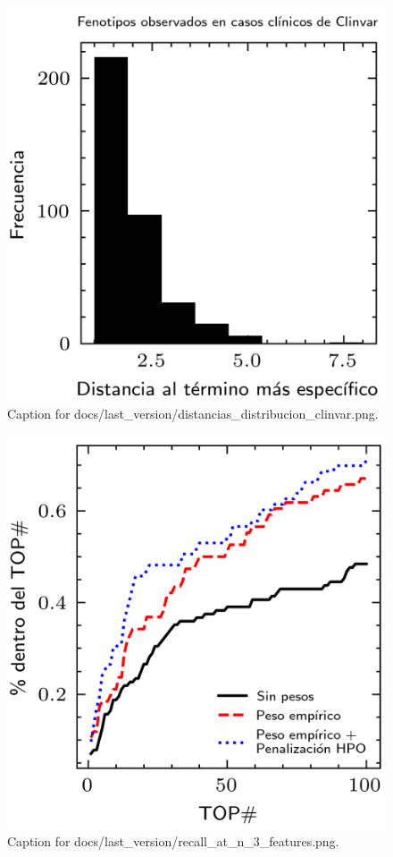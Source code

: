 \documentclass{article}
\begin{document}
\begin{figure}[h] \centering \includegraphics{docs/last_version/distancias_distribucion_clinvar.png} \caption{Caption for docs/last_version/distancias_distribucion_clinvar.png.} \end{figure}
\begin{figure}[h] \centering \includegraphics{docs/last_version/recall_at_n_3_features.png} \caption{Caption for docs/last_version/recall_at_n_3_features.png.} \end{figure}
\end{document}
